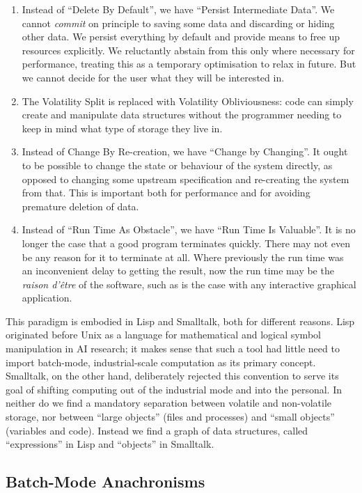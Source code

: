 \documentclass[ twoside,openright,titlepage,numbers=noenddot,headinclude,footinclude,cleardoublepage=empty,abstract=on,
                BCOR=5mm,paper=a4,fontsize=11pt
                ]{scrreprt}
\providecommand{\tightlist}{}\newenvironment{longtable}[2]{\begin{tabular}}{\end{tabular}}
\theoremstyle{definition}
\begin{document}
\begin{enumerate}
\def\labelenumi{\arabic{enumi}.}
\tightlist
\item
  Instead of ``Delete By Default'', we have ``Persist Intermediate
  Data''. We cannot \emph{commit} on principle to saving some data and
  discarding or hiding other data. We persist everything by default and
  provide means to free up resources explicitly. We reluctantly abstain
  from this only where necessary for performance, treating this as a
  temporary optimisation to relax in future. But we cannot decide for
  the user what they will be interested in.
\item
  The Volatility Split is replaced with Volatility Obliviousness: code
  can simply create and manipulate data structures without the
  programmer needing to keep in mind what type of storage they live in.
\item
  Instead of Change By Re-creation, we have ``Change by Changing''. It
  ought to be possible to change the state or behaviour of the system
  directly, as opposed to changing some upstream specification and
  re-creating the system from that. This is important both for
  performance and for avoiding premature deletion of data.
\item
  Instead of ``Run Time As Obstacle'', we have ``Run Time Is Valuable''.
  It is no longer the case that a good program terminates quickly. There
  may not even be any reason for it to terminate at all. Where
  previously the run time was an inconvenient delay to getting the
  result, now the run time may be the \emph{raison d'être} of the
  software, such as is the case with any interactive graphical
  application.
\end{enumerate}

This paradigm is embodied in Lisp and Smalltalk, both for different
reasons. Lisp originated before Unix as a language for mathematical and
logical symbol manipulation in AI research; it makes sense that such a
tool had little need to import batch-mode, industrial-scale computation
as its primary concept. Smalltalk, on the other hand, deliberately
rejected this convention to serve its goal of shifting computing out of
the industrial mode and into the personal. In neither do we find a
mandatory separation between volatile and non-volatile storage, nor
between ``large objects'' (files and processes) and ``small objects''
(variables and code). Instead we find a graph of data structures, called
``expressions'' in Lisp and ``objects'' in Smalltalk.

\hypertarget{batch-mode-anachronisms}{\subsection{Batch-Mode Anachronisms}\label{batch-mode-anachronisms}}
\end{document}
